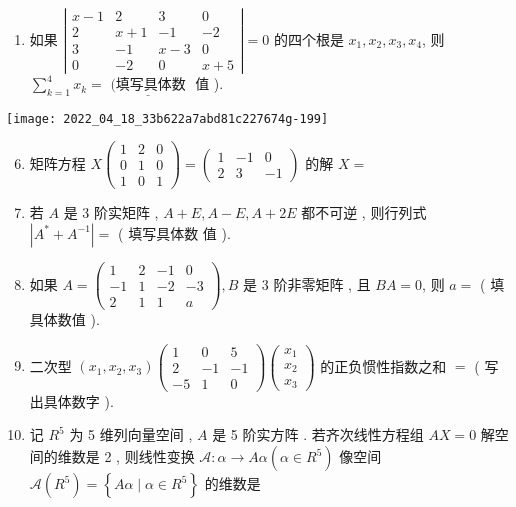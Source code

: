 \documentclass[10pt]{article}
\begin{document}
{\begin{enumerate}
  \item  如果  $\left|\begin{array}{cccc}x-1 & 2 & 3 & 0 \\ 2 & x+1 & -1 & -2 \\ 3 & -1 & x-3 & 0 \\ 0 & -2 & 0 & x+5\end{array}\right|=0$  的四个根是  $x_{1}, x_{2}, x_{3}, x_{4}$,  则  $\sum_{k=1}^{4} x_{k}=\underline{\text { (填写具体数 }}$  值 ).

\end{enumerate}
\texttt{[image: 2022\_04\_18\_33b622a7abd81c227674g-199]}

\begin{enumerate}
  \setcounter{enumi}{5}
  \item  矩阵方程  $X\left(\begin{array}{ccc}1 & 2 & 0 \\ 0 & 1 & 0 \\ 1 & 0 & 1\end{array}\right)=\left(\begin{array}{ccc}1 & -1 & 0 \\ 2 & 3 & -1\end{array}\right)$  的解  $X=$

  \item  若  $A$  是  3  阶实矩阵 , $A+E, A-E, A+2 E$  都不可逆 ,  则行列式  $\left|A^{*}+A^{-1}\right|=$ ( 填写具体数   值 ).

  \item  如果  $A=\left(\begin{array}{cccc}1 & 2 & -1 & 0 \\ -1 & 1 & -2 & -3 \\ 2 & 1 & 1 & a\end{array}\right), B$  是  3  阶非零矩阵 ,  且  $B A=0$,  则  $a=$ ( 填具体数值 ).

  \item  二次型  $\left(x_{1}, x_{2}, x_{3}\right)\left(\begin{array}{ccc}1 & 0 & 5 \\ 2 & -1 & -1 \\ -5 & 1 & 0\end{array}\right)\left(\begin{array}{l}x_{1} \\ x_{2} \\ x_{3}\end{array}\right)$  的正负惯性指数之和  $=$ ( 写出具体数字 ).

  \item  记  $R^{5}$  为  5  维列向量空间 , $A$  是  5  阶实方阵 .  若齐次线性方程组  $A X=0$  解空间的维数是  2 ,  则线性变换  $\mathscr{A}: \alpha \rightarrow A \alpha\left(\alpha \in R^{5}\right)$  像空间  $\mathscr{A}\left(R^{5}\right)=\left\{A \alpha \mid \alpha \in R^{5}\right\}$  的维数是 


\end{enumerate}}
\end{document}
